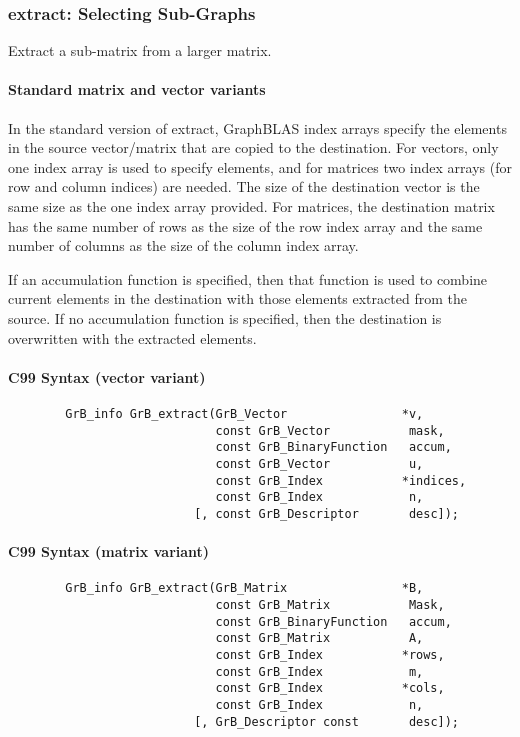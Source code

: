 \subsubsection{{\sf extract}: Selecting Sub-Graphs}

Extract a sub-matrix from a larger matrix. 

\paragraph{Standard matrix and vector variants}

In the standard version of {\sf extract}, GraphBLAS index arrays
specify the elements in the source vector/matrix that are copied to
the destination.  For vectors, only one index array is used to specify
elements, and for matrices two index arrays (for row and column indices)
are needed.  The size of the destination vector is the same size as
the one index array provided.  For matrices, the destination matrix has
the same number of rows as the size of the row index array and the same
number of columns as the size of the column index array.

If an accumulation function is specified,
then that function is
used to combine current elements in the destination with those elements
extracted from the source. If no accumulation function is specified, then
the destination is overwritten with the extracted elements.

\paragraph{C99 Syntax (vector variant)}

\begin{verbatim}
        GrB_info GrB_extract(GrB_Vector                *v,
                             const GrB_Vector           mask,
                             const GrB_BinaryFunction   accum,
                             const GrB_Vector           u,
                             const GrB_Index           *indices,
                             const GrB_Index            n,
                          [, const GrB_Descriptor       desc]);
\end{verbatim}

\paragraph{C99 Syntax (matrix variant)}

\begin{verbatim}                 
        GrB_info GrB_extract(GrB_Matrix                *B,
                             const GrB_Matrix           Mask,
                             const GrB_BinaryFunction   accum,
                             const GrB_Matrix           A,
                             const GrB_Index           *rows,
                             const GrB_Index            m,
                             const GrB_Index           *cols,
                             const GrB_Index            n,
                          [, GrB_Descriptor const       desc]);
\end{verbatim}

